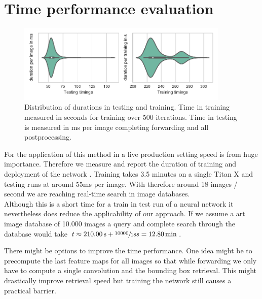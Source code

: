 \section{Time performance evaluation}
\label{sec:results:time}
\begin{figure}[h!]
  \centering
  \includegraphics[width=0.9\textwidth]{figures/timings_fig}
  \caption{Distribution of durations in testing and training. Time in training measured in seconds for training over 500 iterations. Time in testing is measured in ms per image completing forwarding and all postprocessing.}
  \label{fig:timings}
\end{figure}
For the application of this method in a live production setting speed is from huge importance. Therefore we measure and report the duration of training and deployment of the network . Training takes 3.5 minutes on a single Titan X and testing runs at around 55ms per image. With therefore around 18 images / second we are reaching real-time search in image databases.\\
Although this is a short time for a train in test run of a neural network it  nevertheless does reduce the applicability of our approach. If we assume a art image database of 10.000 images a query and complete search through the database would take $t \approx \SI{210}{\second} + \sfrac{10000}{18}s = \SI{12.8}{\minute}$.

There might be options to improve the time performance. One idea might be to precompute the last feature maps for all images so that while forwarding we only have to compute a single convolution and the bounding box retrieval. This might drastically improve retrieval speed but training the network still causes a practical barrier.
